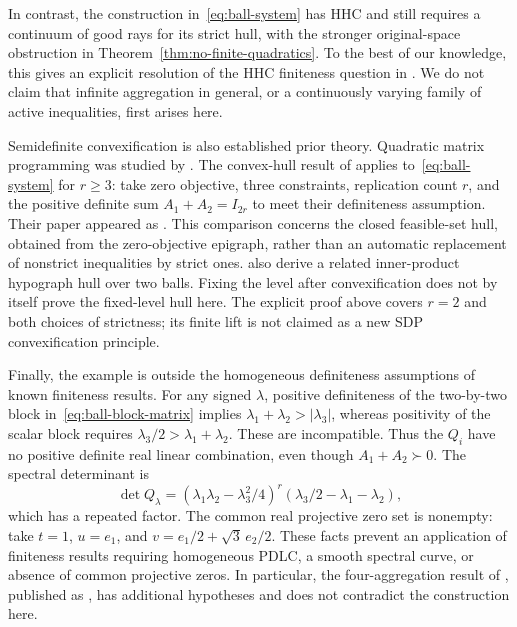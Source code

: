 In contrast, the construction in~\eqref{eq:ball-system} has HHC
and still requires a continuum of good rays for its strict hull, with
the stronger original-space obstruction in
Theorem~\ref{thm:no-finite-quadratics}. To the best of our knowledge,
this gives an explicit resolution of the HHC finiteness question in
\citet[Conjecture~3.1]{BDSpreprint}. We do not claim that infinite
aggregation in general, or a continuously varying family of active
inequalities, first arises here.

Semidefinite convexification is also established prior theory.
Quadratic matrix programming was studied by \citet{Beck2007}.
The convex-hull result of \citet[Section~4.1]{WangKilincKarzanPreprint}
applies to~\eqref{eq:ball-system} for $r\geq3$: take zero
objective, three constraints, replication count $r$, and the
positive definite sum $A_1+A_2=I_{2r}$ to meet their
definiteness assumption. Their paper appeared as
\citep{WangKilincKarzan2024}. This comparison concerns the
closed feasible-set hull, obtained from the zero-objective
epigraph, rather than an automatic replacement of nonstrict
inequalities by strict ones. \citet[Section~3.2.1, Corollary~1]{BrunSunWatson2026}
also derive a related inner-product hypograph hull over two
balls. Fixing the level after convexification does not by itself
prove the fixed-level hull here. The explicit proof above covers
$r=2$ and both choices of strictness; its finite lift is not
claimed as a new SDP convexification principle.

Finally, the example is outside the homogeneous definiteness
assumptions of known finiteness results. For any signed
$\lambda$, positive definiteness of the two-by-two block
in~\eqref{eq:ball-block-matrix} implies
$\lambda_1+\lambda_2>|\lambda_3|$, whereas positivity of the
scalar block requires
$\lambda_3/2>\lambda_1+\lambda_2$. These are incompatible.
Thus the $Q_i$ have no positive definite real linear combination,
even though $A_1+A_2\succ0$. The spectral determinant is
\[
 \det Q_\lambda=
 (\lambda_1\lambda_2-\lambda_3^2/4)^r
 (\lambda_3/2-\lambda_1-\lambda_2),
\]
which has a repeated factor. The common real projective zero set
is nonempty: take $t=1$, $u=e_1$, and
$v=e_1/2+\sqrt3\,e_2/2$. These facts prevent an application of
finiteness results requiring homogeneous PDLC, a smooth spectral
curve, or absence of common projective zeros. In particular, the
four-aggregation result of \citet[Theorem~1.4]{BDpreprint}, published
as \citep{BD2025}, has additional hypotheses and does not contradict
the construction here.
